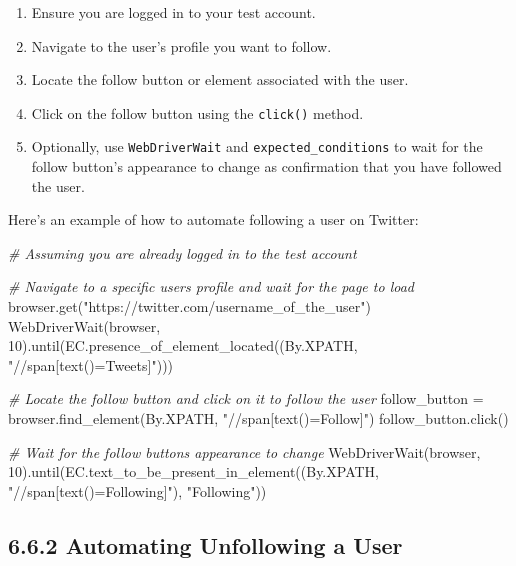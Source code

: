 \documentclass[
  paper=a4,
  ,captions=tableheading
]{scrartcl}
\newenvironment{Shaded}{}{}
\newcommand{\CommentTok}[1]{\textcolor[rgb]{0.38,0.63,0.69}{\textit{#1}}}
\newcommand{\DecValTok}[1]{\textcolor[rgb]{0.25,0.63,0.44}{#1}}
\newcommand{\NormalTok}[1]{#1}
\newcommand{\OperatorTok}[1]{\textcolor[rgb]{0.40,0.40,0.40}{#1}}
\newcommand{\StringTok}[1]{\textcolor[rgb]{0.25,0.44,0.63}{#1}}
\providecommand{\tightlist}{%
  \setlength{\itemsep}{0pt}\setlength{\parskip}{0pt}}
\begin{document}
\begin{enumerate}
\def\labelenumi{\arabic{enumi}.}
\tightlist
\item
  Ensure you are logged in to your test account.
\item
  Navigate to the user's profile you want to follow.
\item
  Locate the follow button or element associated with the user.
\item
  Click on the follow button using the \texttt{click()} method.
\item
  Optionally, use \texttt{WebDriverWait} and
  \texttt{expected\_conditions} to wait for the follow button's
  appearance to change as confirmation that you have followed the user.
\end{enumerate}

Here's an example of how to automate following a user on Twitter:

\begin{Shaded}
\begin{Highlighting}[]
\CommentTok{\# Assuming you are already logged in to the test account}

\CommentTok{\# Navigate to a specific user\textquotesingle{}s profile and wait for the page to load}
\NormalTok{browser.get(}\StringTok{"https://twitter.com/username\_of\_the\_user"}\NormalTok{)}
\NormalTok{WebDriverWait(browser, }\DecValTok{10}\NormalTok{).until(EC.presence\_of\_element\_located((By.XPATH, }\StringTok{"//span[text()=\textquotesingle{}Tweets\textquotesingle{}]"}\NormalTok{)))}

\CommentTok{\# Locate the follow button and click on it to follow the user}
\NormalTok{follow\_button }\OperatorTok{=}\NormalTok{ browser.find\_element(By.XPATH, }\StringTok{"//span[text()=\textquotesingle{}Follow\textquotesingle{}]"}\NormalTok{)}
\NormalTok{follow\_button.click()}

\CommentTok{\# Wait for the follow button\textquotesingle{}s appearance to change}
\NormalTok{WebDriverWait(browser, }\DecValTok{10}\NormalTok{).until(EC.text\_to\_be\_present\_in\_element((By.XPATH, }\StringTok{"//span[text()=\textquotesingle{}Following\textquotesingle{}]"}\NormalTok{), }\StringTok{"Following"}\NormalTok{))}
\end{Highlighting}
\end{Shaded}

\hypertarget{automating-unfollowing-a-user}{%
\subsection{6.6.2 Automating Unfollowing a
User}\label{automating-unfollowing-a-user}}
\end{document}
